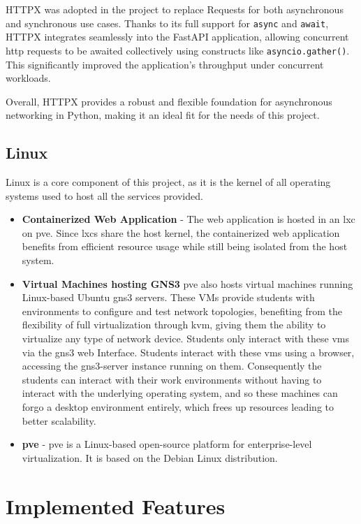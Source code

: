HTTPX was adopted in the project to replace Requests for both asynchronous and synchronous use cases. Thanks to its full 
support for \texttt{async} and \texttt{await}, HTTPX integrates seamlessly into the FastAPI application, allowing 
concurrent \ac{http} requests to be awaited collectively using constructs like \texttt{asyncio.gather()}. This significantly 
improved the application's throughput under concurrent workloads.

Overall, HTTPX provides a robust and flexible foundation for asynchronous networking in Python, making it an ideal 
fit for the needs of this project.


\subsection{Linux}
Linux is a core component of this project, as it is the kernel of all operating systems used to host all the services provided.

\begin{itemize}
  \item \textbf{Containerized Web Application} - The web application is hosted in an \ac{lxc} on \ac{pve}. Since \ac{lxc}s share 
  the host kernel, the containerized web application benefits from efficient resource usage while still being isolated from the host system.
  \item \textbf{Virtual Machines hosting GNS3} \ac{pve} also hosts virtual machines running Linux-based Ubuntu \ac{gns3} servers. 
  These VMs provide students with environments to configure and test network topologies, benefiting from the 
  flexibility of full virtualization through \ac{kvm}, giving them the ability to virtualize any type of network device.
  Students only interact with these \ac{vm}s via the \ac{gns3} web Interface. Students interact with these \ac{vm}s using a browser, 
  accessing the gns3-server instance running on them. Consequently the students can interact with their work environments without having to 
  interact with the underlying operating system, and so these machines can forgo a desktop environment entirely, which frees up resources 
  leading to better scalability.
  \item \textbf{\ac{pve}} - \ac{pve} is a Linux-based open-source platform for enterprise-level virtualization. It is based
  on the Debian Linux distribution.
\end{itemize}

\section{Implemented Features}

